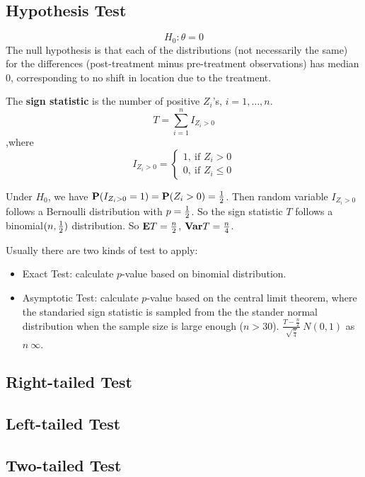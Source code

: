\subsection{Hypothesis Test}
\[H_0: \theta = 0\]
The null hypothesis is that each of the distributions (not necessarily the same) for the
differences (post-treatment minus pre-treatment observations) has
median 0, corresponding to no shift in location due to the
treatment.

The \textbf{sign statistic} is the number of positive $Z_i$'s, $i = 1, \dots, n$.
\[T = \sum_{i=1}^{n} I_{Z_i > 0}\]
,where
\[I_{Z_i > 0} = 
\begin{cases}
	1, ~\text{if $Z_i > 0$}\\
	0, ~\text{if $Z_i \le 0$}
\end{cases}\]

Under $H_0$, we have ${\mathbf P}(I_{Z_i > 0} = 1) = {\mathbf P}(Z_i > 0) = \frac{1}{2}$. Then random variable $I_{Z_i > 0}$ follows a Bernoulli distribution with $p= \frac{1}{2}$. So the sign statistic $T$ follows a binomial$(n, \frac{1}{2})$ distribution. So ${\mathbf E} T = \frac{n}{2}$, ${\mathbf{Var}} T = \frac{n}{4}$.

Usually there are two kinds of test to apply:
\begin{itemize}
	\item Exact Test: calculate $p$-value based on binomial distribution.
	\item Asymptotic Test: calculate $p$-value based on the central limit theorem, where the standaried sign statistic is sampled from the the stander normal distribution when the sample size is large enough ($n > 30$). $\frac{T - \frac{n}{2}}{\sqrt{\frac{n}{4}}} \> N(0, 1)$ as $n \> \infty$.
\end{itemize}

\subsection{Right-tailed Test}
\subsection{Left-tailed Test}
\subsection{Two-tailed Test}